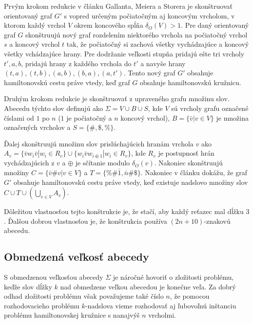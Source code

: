 Prvým krokom redukcie v článku Gallanta, Meiera a Storera je skonštruovať orientovaný
graf $G'$ s vopred určeným počiatočným aj koncovým vrcholom, v ktorom každý vrchol $V$
okrem koncového spĺňa $\delta_O(V) > 1$. Pre daný orientovaný graf $G$
skonštruujú nový graf rozdelením niektorého vrchola na počiatočný vrchol $s$ a
koncový vrchol $t$ tak, že počiatočný si zachová všetky vychádzajúce a koncový
všetky vchádzajúce hrany. Pre dodržanie veľkosti stupňa pridajú ešte tri vrcholy
$t', a, b$, pridajú hrany z každého vrchola do $t'$ a navyše hrany $(t, a), (t, b),
(a, b), (b, a), (a, t')$. Tento nový graf $G'$ obsahuje hamiltonovskú cestu práve vtedy,
keď graf $G$ obsahuje hamiltonovskú kružnicu.

Druhým krokom redukcie je skonštruovať z upraveného grafu množinu slov. Abecedu
týchto slov definujú ako $\Sigma = V \cup B \cup S$, kde $V$ sú vrcholy grafu označené
číslami od $1$ po $n$ ($1$ je počiatočný a $n$ koncový vrchol), $B = \{ \bar{v} | v \in V \}$
je množina označených vrcholov a $S = \{\#, \$, \% \}$.

Ďalej skonštruujú množinu slov prislúchajúcich hranám vrchola $v$ ako
$A_v = \{ \bar{v}w_i\bar{v} | w_i \in R_v\} \cup \{ w_i \bar{v} w_{i \oplus 1} | w_i \in R_v\}$,
kde $R_v$ je postupnosť hrán vychádzajúcich z $v$ a $\oplus$ je sčítanie modulo $\delta_O(v)$.
Nakoniec skonštruujú množiny $C = \{ \bar{v} \# v | v \in V\}$ a $T = \{ \% \# \bar{1}, \bar{n} \# \$\}$.
Nakoniec v článku dokážu, že graf $G'$ obsahuje hamiltonovskú cestu práve vtedy, keď
existuje nadslovo množiny slov $C \cup T \cup (\bigcup\limits_{v \in V} A_v)$.

Dôležitou vlastnosťou tejto konštrukcie je, že stačí, aby každý reťazec mal dĺžku $3$. Ďalšou dobrou
vlastnosťou je, že konštrukcia používa $(2n + 10)$-znakovú abecedu.

\subsection{Obmedzená veľkosť abecedy}

S obmedzenou veľkosťou abecedy $\Sigma$ je náročné hovoriť o zložitosti problému, keďže
slov dĺžky $k$ nad obmedzene veľkou abecedou je konečne veľa. Za dobrý odhad
zložitosti problému však považujeme také číslo $n$, že pomocou rozhodovacieho
problému $k$-nadslova vieme rozhodovať aj ľubovoľnú inštanciu problému
hamiltonovskej kružnice s nanajvýš $n$ vrcholmi.

